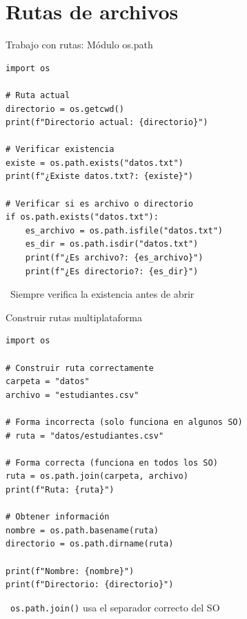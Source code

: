 \documentclass{beamer}
\begin{document}
\section{Rutas de archivos}

\begin{frame}[fragile]{Trabajo con rutas: Módulo os.path \faRoute}
\begin{lstlisting}
import os

# Ruta actual
directorio = os.getcwd()
print(f"Directorio actual: {directorio}")

# Verificar existencia
existe = os.path.exists("datos.txt")
print(f"¿Existe datos.txt?: {existe}")

# Verificar si es archivo o directorio
if os.path.exists("datos.txt"):
    es_archivo = os.path.isfile("datos.txt")
    es_dir = os.path.isdir("datos.txt")
    print(f"¿Es archivo?: {es_archivo}")
    print(f"¿Es directorio?: {es_dir}")
\end{lstlisting}

\vspace{-0.1cm}
\begin{notebox}
\small\faCheckCircle\ Siempre verifica la existencia antes de abrir
\end{notebox}
\end{frame}

\begin{frame}[fragile]{Construir rutas multiplataforma \faFolderTree}
\begin{lstlisting}
import os

# Construir ruta correctamente
carpeta = "datos"
archivo = "estudiantes.csv"

# Forma incorrecta (solo funciona en algunos SO)
# ruta = "datos/estudiantes.csv"

# Forma correcta (funciona en todos los SO)
ruta = os.path.join(carpeta, archivo)
print(f"Ruta: {ruta}")

# Obtener información
nombre = os.path.basename(ruta)
directorio = os.path.dirname(ruta)

print(f"Nombre: {nombre}")
print(f"Directorio: {directorio}")
\end{lstlisting}

\vspace{-0.1cm}
\begin{notebox}
\small\faLightbulb\ \texttt{os.path.join()} usa el separador correcto del SO
\end{notebox}
\end{frame}
\end{document}
